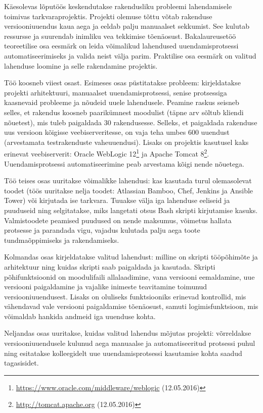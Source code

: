 \documentclass[12pt]{article}
\begin{document}
  Käesolevas lõputöös keskendutakse rakendusliku probleemi lahendamisele toimivas tarkvaraprojektis. Projekti olemuse tõttu võtab rakenduse versiooniuuendus kaua aega ja eeldab palju manuaalset sekkumist. See kulutab ressursse ja suurendab inimliku vea tekkimise tõenäosust. Bakalaureusetöö teoreetilise osa eesmärk on leida võimalikud lahendused uuendamisprotsessi automatiseerimiseks ja valida neist välja parim. Praktilise osa eesmärk on valitud lahenduse loomine ja selle rakendamine projektis.
  
  Töö koosneb viiest osast. Esimeses osas püstitatakse probleem: kirjeldatakse projekti arhitektuuri, manuaalset uuendamisprotsessi, senise protsessiga kaasnevaid probleeme ja nõudeid uuele lahendusele. Peamine raskus seisneb selles, et rakendus koosneb paarikümnest moodulist (täpne arv sõltub kliendi nõuetest), mis tuleb paigaldada 30 rakendusesse. Selleks, et paigaldada rakenduse uus versioon kõigisse veebiserveritesse, on vaja teha umbes 600 uuendust (arvestamata testrakenduste vaheuuendusi). Lisaks on projektis kasutusel kaks erinevat veebiserverit: Oracle WebLogic 12\footnote{\url{https://www.oracle.com/middleware/weblogic} (12.05.2016)} ja Apache Tomcat 8\footnote{\url{http://tomcat.apache.org} (12.05.2016)}. Uuendamisprotsessi automatiseerimine peab arvestama kõigi nende nõuetega.
  
  Töö teises osas uuritakse võimalikke lahendusi: kas kasutada turul olemasolevat toodet (töös uuritakse nelja toodet: Atlassian Bamboo, Chef, Jenkins ja Ansible Tower) või kirjutada ise tarkvara. Tuuakse välja iga lahenduse eeliseid ja puuduseid ning selgitatakse, miks langetati otsus Bash skripti kirjutamise kasuks. Valmistoodete peamised puudused on nende maksumus, võimetus hallata protsesse ja parandada vigu, vajadus kulutada palju aega toote tundmaõppimiseks ja rakendamiseks.
  
  Kolmandas osas kirjeldatakse valitud lahendust: milline on skripti tööpõhimõte ja arhitektuur ning kuidas skripti saab paigaldada ja kasutada. Skripti põhifunk\-tsioonid on moodulifaili allalaadimine, vana versiooni eemaldamine, uue versiooni paigaldamine ja vajalike inimeste teavitamine toimunud versiooniuuendusest. Lisaks on oluliseks funktsiooniks erinevad kontrollid, mis vähendavad vale versiooni paigaldamise tõenäosust, samuti logimisfunktsioon, mis võimaldab hankida andmeid iga uuenduse kohta.
  
  Neljandas osas uuritakse, kuidas valitud lahendus mõjutas projekti: võrreldakse versiooniuuendusele kulunud aega manuaalse ja automatiseeritud protsessi puhul ning esitatakse kolleegidelt uue uuendamisprotsessi kasutamise kohta saadud tagasisidet.
  
\end{document}
